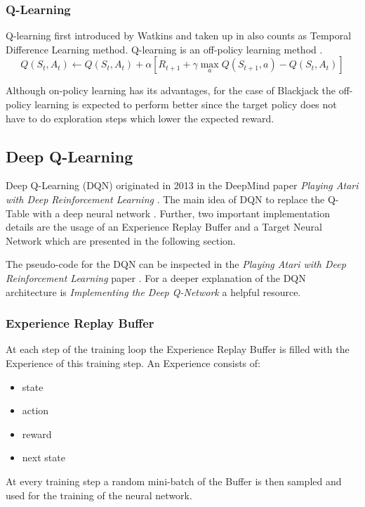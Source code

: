 \documentclass[conference]{IEEEtran}
\begin{document}
\subsubsection{Q-Learning}
Q-learning first introduced by Watkins \cite{b5} and taken up in \cite{b4} also counts as Temporal Difference Learning method.
Q-learning is an off-policy learning method \cite{b4}.
\begin{equation*}
	Q(S_t, A_t) \leftarrow Q(S_t, A_t) + \alpha [R_{t+1} + \gamma \max_a Q(S_{t+1}, a) - Q(S_t, A_t)] \tag{3}
\end{equation*}

Although on-policy learning has its advantages, for the case of Blackjack the off-policy learning is expected to perform better since the target policy does not have to do exploration steps which lower the expected reward.


\subsection{Deep Q-Learning}
Deep Q-Learning (DQN) originated in 2013 in the DeepMind paper \textit{Playing Atari with Deep Reinforcement Learning} \cite{b2}.
The main idea of DQN to replace the Q-Table with a deep neural network \cite{b2}. 
Further, two important implementation details are the usage of an Experience Replay Buffer and a Target Neural Network which are presented in the following section.

The pseudo-code for the DQN can be inspected in the \textit{Playing Atari with Deep Reinforcement Learning} paper \cite{b2}.
For a deeper explanation of the DQN architecture is \textit{Implementing the Deep Q-Network} \cite{b6} a helpful resource. 

\subsubsection{Experience Replay Buffer} \label{replay-buffer}
At each step of the training loop the Experience Replay Buffer is filled with the Experience of this training step. 
An Experience consists of:
\begin{itemize}
	\item state
	\item action
	\item reward
	\item next state
\end{itemize}
At every training step a random mini-batch of the Buffer is then sampled and used for the training of the neural network.
\end{document}
